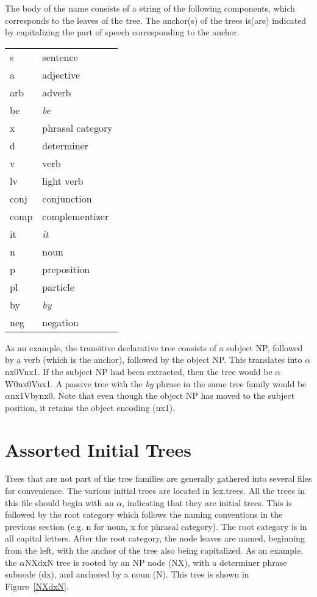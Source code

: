 \noindent The body of the name consists of a string of the following 
components, which corresponds to the leaves of the tree.  The anchor(s) of the
trees is(are) indicated by capitalizing the part of speech corresponding to the
anchor.

\begin{description}
\item\begin{tabular}{ll}
s&sentence\\
a&adjective\\
arb&adverb\\
be&{\it be}\\
x&phrasal category\\
d&determiner\\
v&verb\\
lv&light verb\\
conj&conjunction\\
comp&complementizer\\
it&{\it it}\\
n&noun\\
p&preposition\\
pl&particle\\
by&{\it by}\\
neg&negation\\
\end{tabular}
\end{description}

\noindent As an example, the transitive declarative tree consists of a subject
NP, followed by a verb (which is the anchor), followed by the object NP.  This
translates into $\alpha$nx0Vnx1.  If the subject NP had been extracted, then
the tree would be $\alpha$W0nx0Vnx1.  A passive tree with the {\it by} phrase
in the same tree family would be $\alpha$nx1Vbynx0.  Note that even though the
object NP has moved to the subject position, it retains the object encoding
(nx1).

\section{Assorted Initial Trees}

Trees that are not part of the tree families are generally gathered into
several files for convenience.  The various initial trees are located in
lex.trees.  All the trees in this file should begin with an $\alpha$,
indicating that they are initial trees.  This is followed by the root category
which follows the naming conventions in the previous section (e.g. n for noun,
x for phrasal category).  The root category is in all capital letters.  After
the root category, the node leaves are named, beginning from the left, with the
anchor of the tree also being capitalized.  As an example, the $\alpha$NXdxN
tree is rooted by an NP node (NX), with a determiner phrase subnode (dx), and
anchored by a noun (N).  This tree is shown in Figure~\ref{NXdxN}.

